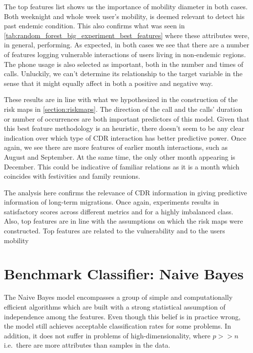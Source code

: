 The top features list shows us the importance of mobility diameter in both cases.
Both weeknight and whole week user's mobility, is deemed relevant to detect his past endemic condition.
This also confirms what was seen in \cref{tab:random_forest_big_experiment_best_features} where these attributes were, in general, performing.
As expected, in both cases we see that there are a number of features logging vulnerable interactions of users living in non-endemic regions.
The phone usage is also selected as important, both in the number and times of calls.
Unluckily, we can't determine its relationship to the target variable in the sense that it might equally affect in both a positive and negative way.

These results are in line with what we hypothesized in the construction of the risk maps in \cref{section:riskmaps}.
The direction of the call and the calls' duration or number of occurrences are both important predictors of this model.
Given that this best feature methodology is an heuristic, there doesn't seem to be any clear indication over which type of CDR interaction has better predictive power.
Once again, we see there are more features of earlier month interactions, such as August and September.
At the same time, the only other month appearing is December.
This could be indicative of familiar relations as it is a month which coincides with festivities and family reunions.

The analysis here confirms the relevance of CDR information in giving predictive information of long-term migrations.
Once again, experiments results in satisfactory scores across different metrics and for a highly imbalanced class.
Also, top features are in line with the assumptions on which the risk maps were constructed.
Top features are related to the vulnerability and to the users mobility



\section{Benchmark Classifier: Naive Bayes}\label{section:naive_bayes}

The Naive Bayes model encompasses a group of simple and computationally efficient algorithms which are built with a strong statistical assumption of independence among the features.
Even though this belief is in practice wrong, the model still achieves acceptable classification rates for some problems.
In addition, it does not suffer in problems of high-dimensionality, where $p >> n$ i.e.\ there are more attributes than samples in the data.

